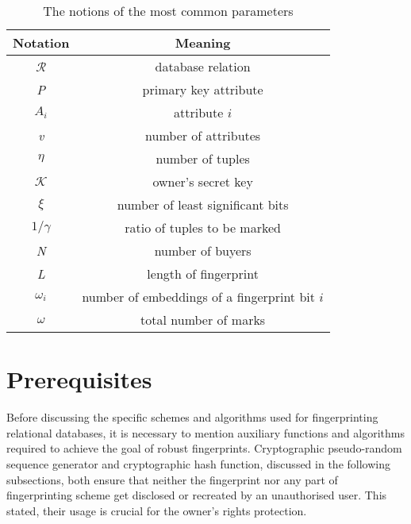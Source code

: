 \begin{table}
\centering
\caption{The notions of the most common parameters}
\label{table:notation}
\begin{tabular}{|c | c|} 
 \hline
 Notation & Meaning \\ 
 \hline\hline
 $\mathcal{R}$ & database relation \\
 \hline
 \textit{P} & primary key attribute \\
 \hline
 $A_i$ & attribute $i$ \\
 \hline
 \textit{v} & number of attributes \\
 \hline
 $\eta$ & number of tuples  \\
 \hline
 $\mathcal{K}$ & owner's secret key  \\
 \hline
 $\xi$ & number of least significant bits \\ 
 \hline
 $1/\gamma$ & ratio of tuples to be marked\\
 \hline
 \textit{N} & number of buyers \\
 \hline
 \textit{L} & length of fingerprint \\
 \hline
 $\omega_i$ & number of embeddings of a fingerprint bit $i$ \\
 \hline
 $\omega$ & total number of marks \\
 \hline
\end{tabular}
\end{table}

\section{Prerequisites}
Before discussing the specific schemes and algorithms used for fingerprinting relational databases, it is necessary to mention auxiliary functions and algorithms required to achieve the goal of robust fingerprints. 
Cryptographic pseudo-random sequence generator and cryptographic hash function, discussed in the following subsections, both ensure that neither the fingerprint nor any part of fingerprinting scheme get disclosed or recreated by an unauthorised user.
This stated, their usage is crucial for the owner's rights protection.

